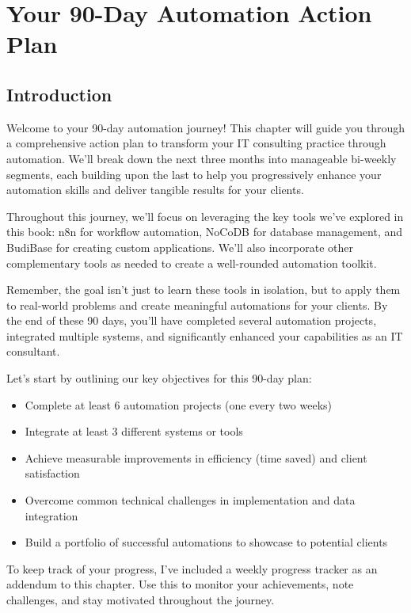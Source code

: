 \chapter{Your 90-Day Automation Action Plan}



\section{Introduction}

Welcome to your 90-day automation journey! This chapter will guide you through a comprehensive action plan to transform your IT consulting practice through automation. We'll break down the next three months into manageable bi-weekly segments, each building upon the last to help you progressively enhance your automation skills and deliver tangible results for your clients.

Throughout this journey, we'll focus on leveraging the key tools we've explored in this book: n8n for workflow automation, NoCoDB for database management, and BudiBase for creating custom applications. We'll also incorporate other complementary tools as needed to create a well-rounded automation toolkit.

Remember, the goal isn't just to learn these tools in isolation, but to apply them to real-world problems and create meaningful automations for your clients. By the end of these 90 days, you'll have completed several automation projects, integrated multiple systems, and significantly enhanced your capabilities as an IT consultant.

Let's start by outlining our key objectives for this 90-day plan:

\begin{itemize}
    \item Complete at least 6 automation projects (one every two weeks)
    \item Integrate at least 3 different systems or tools
    \item Achieve measurable improvements in efficiency (time saved) and client satisfaction
    \item Overcome common technical challenges in implementation and data integration
    \item Build a portfolio of successful automations to showcase to potential clients
\end{itemize}

To keep track of your progress, I've included a weekly progress tracker as an addendum to this chapter. Use this to monitor your achievements, note challenges, and stay motivated throughout the journey.


